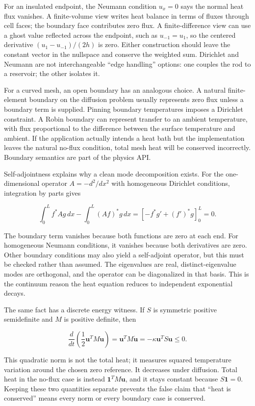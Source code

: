 For an insulated endpoint, the Neumann condition \(u_x=0\) says the normal heat flux vanishes. A finite-volume view writes heat balance in terms of fluxes through cell faces; the boundary face contributes zero flux. A finite-difference view can use a ghost value reflected across the endpoint, such as \(u_{-1}=u_1\), so the centered derivative \((u_1-u_{-1})/(2h)\) is zero. Either construction should leave the constant vector in the nullspace and conserve the weighted sum. Dirichlet and Neumann are not interchangeable ``edge handling'' options: one couples the rod to a reservoir; the other isolates it.

For a curved mesh, an open boundary has an analogous choice. A natural finite-element boundary on the diffusion problem usually represents zero flux unless a boundary term is supplied. Pinning boundary temperatures imposes a Dirichlet constraint. A Robin boundary can represent transfer to an ambient temperature, with flux proportional to the difference between the surface temperature and ambient. If the application actually intends a heat bath but the implementation leaves the natural no-flux condition, total mesh heat will be conserved incorrectly. Boundary semantics are part of the physics API.

Self-adjointness explains why a clean mode decomposition exists. For the one-dimensional operator \(A=-d^2/dx^2\) with homogeneous Dirichlet conditions, integration by parts gives

\[
\int_0^L f^*Ag\,dx-\int_0^L(Af)^*g\,dx
=\left[-f^*g'+(f')^*g\right]_0^L=0.
\]

The boundary term vanishes because both functions are zero at each end. For homogeneous Neumann conditions, it vanishes because both derivatives are zero. Other boundary conditions may also yield a self-adjoint operator, but this must be checked rather than assumed. The eigenvalues are real, distinct-eigenvalue modes are orthogonal, and the operator can be diagonalized in that basis. This is the continuum reason the heat equation reduces to independent exponential decays.

The same fact has a discrete energy witness. If \(S\) is symmetric positive semidefinite and \(M\) is positive definite, then

\[
\frac{d}{dt}\left(\frac12\mathbf u^TM\mathbf u\right)
=\mathbf u^TM\dot{\mathbf u}
=-\kappa\mathbf u^TS\mathbf u\le0.
\]

This quadratic norm is not the total heat; it measures squared temperature variation around the chosen zero reference. It decreases under diffusion. Total heat in the no-flux case is instead \(\mathbf1^TM\mathbf u\), and it stays constant because \(S\mathbf1=0\). Keeping these two quantities separate prevents the false claim that ``heat is conserved'' means every norm or every boundary case is conserved.

